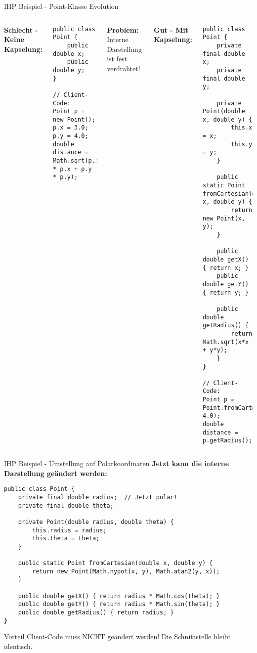 \begin{frame}[fragile]{IHP Beispiel - Point-Klasse Evolution}
  \begin{columns}[T]
    \textbf{Schlecht - Keine Kapselung:}
    \begin{lstlisting}[style=java, basicstyle=\tiny\ttfamily]
public class Point {
    public double x;
    public double y;
}

// Client-Code:
Point p = new Point();
p.x = 3.0;
p.y = 4.0;
double distance = Math.sqrt(p.x * p.x + p.y * p.y);
    \end{lstlisting}
    \textbf{Problem:} Interne Darstellung ist fest verdrahtet!

    \textbf{Gut - Mit Kapselung:}
    \begin{lstlisting}[style=java, basicstyle=\tiny\ttfamily]
public class Point {
    private final double x;
    private final double y;

    private Point(double x, double y) {
        this.x = x;
        this.y = y;
    }

    public static Point fromCartesian(double x, double y) {
        return new Point(x, y);
    }

    public double getX() { return x; }
    public double getY() { return y; }

    public double getRadius() {
        return Math.sqrt(x*x + y*y);
    }
}

// Client-Code:
Point p = Point.fromCartesian(3.0, 4.0);
double distance = p.getRadius();
    \end{lstlisting}
  \end{columns}
\end{frame}

\begin{frame}[fragile]{IHP Beispiel - Umstellung auf Polarkoordinaten}
  \textbf{Jetzt kann die interne Darstellung geändert werden:}
  \begin{lstlisting}[style=java, basicstyle=\tiny\ttfamily]
public class Point {
    private final double radius;  // Jetzt polar!
    private final double theta;

    private Point(double radius, double theta) {
        this.radius = radius;
        this.theta = theta;
    }

    public static Point fromCartesian(double x, double y) {
        return new Point(Math.hypot(x, y), Math.atan2(y, x));
    }

    public double getX() { return radius * Math.cos(theta); }
    public double getY() { return radius * Math.sin(theta); }
    public double getRadius() { return radius; }
}
  \end{lstlisting}
  \begin{exampleblock}{Vorteil}
    Client-Code muss NICHT geändert werden! Die Schnittstelle bleibt identisch.
  \end{exampleblock}
\end{frame}

